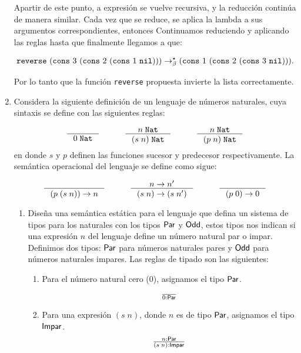 \documentclass{article}
\begin{document}
\begin{enumerate}
        Apartir de este punto, a expresión se vuelve recursiva, y la reducción continúa de manera similar. Cada vez que se reduce, se aplica la lambda a sus argumentos correspondientes, entonces Continuamos reduciendo y aplicando las reglas hasta que finalmente llegamos a que:
 
        \[{\tt reverse}\,\, ({\tt cons}\,\, 3\,\, ({\tt cons}\,\, 2\,\, ({\tt cons}\,\, 1\,\, {\tt nil}))) \to^\star_\beta ({\tt cons}\,\, 1\,\, ({\tt cons}\,\, 2\,\, ({\tt cons}\,\, 3\,\, {\tt nil}))).\]

        Por lo tanto que la función {\tt reverse} propuesta invierte la lista correctamente.\\

        \item Considera la siguiente definición de un lenguaje de números naturales, cuya sintaxis se define con las siguientes reglas:

         \[
        \begin{array}{ccccc}
            \inference{}{0\;\tt{Nat}}&
            \quad&
            \inference{n\;\tt{Nat}}{(s\;n)\;\tt{Nat}}&
            \quad&
            \inference{n\;\tt{Nat}}{(p\;n)\;\tt{Nat}}
        \end{array}
        \]
        \noindent
        en donde $s$ y $p$ definen las funciones sucesor y predecesor respectivamente. La semántica operacional del lenguaje se define como sigue:

        \[
        \begin{array}{ccccc}
            \inference{}{(p\;(s\;n))\to n}&
            \quad&
            \inference{n\to n'}{(s\;n)\to(s\;n')}&
            \quad&
            \inference{}{(p\;0)\to 0}
        \end{array}
        \]

        \begin{enumerate}
            \item Diseña una semántica estática para el lenguaje que defina un sistema de tipos para los naturales con los tipos ${\sf Par}$ y ${\sf Odd}$, estos tipos nos indican si una expresión $n$ del lenguaje define un número natural par o impar.
            Definimos dos tipos: ${\sf Par}$ para números naturales pares y ${\sf Odd}$ para números naturales impares. Las reglas de tipado son las siguientes:

            \begin{enumerate}
                \item Para el número natural cero ($0$), asignamos el tipo ${\sf Par}$.
                \[
                \begin{array}{c}
                    \frac{}{0 : {\sf Par}}
                \end{array}
                \]
                \item Para una expresión $(s\;n)$, donde $n$ es de tipo ${\sf Par}$, asignamos el tipo ${\sf Impar}$.
                \[
                \begin{array}{c}
                    \frac{n : {\sf Par}}{(s\;n) : {\sf Impar}}
                \end{array}
                \]


\end{enumerate}
\end{enumerate}
\end{enumerate}
\end{document}
